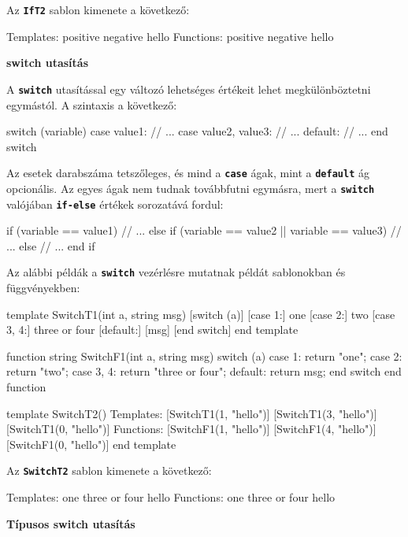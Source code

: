 \documentclass[12pt, a4paper]{report}
\newcommand{\ff}[1]{\textbf{\texttt{#1}}}
\newcommand{\bb}[1]{\textbf{#1}}
\begin{document}
Az \ff{IfT2} sablon kimenete a következő:

\begin{textcode}
Templates:
  positive
  negative
  hello
Functions:
  positive
  negative
  hello
\end{textcode}

\bb{switch utasítás}

A \ff{switch} utasítással egy változó lehetséges értékeit lehet megkülönböztetni egymástól. A szintaxis a következő:

\begin{mgencode}
switch (variable)
case value1:
// ...
case value2, value3:
// ...
default:
// ...
end switch
\end{mgencode}

Az esetek darabszáma tetszőleges, és mind a \ff{case} ágak, mint a \ff{default} ág opcionális. Az egyes ágak nem tudnak továbbfutni egymásra, mert a \ff{switch} valójában \ff{if-else} értékek sorozatává fordul:

\begin{mgencode}
if (variable == value1)
// ...
else if (variable == value2 || variable == value3)
// ...
else
// ...
end if
\end{mgencode}

Az alábbi példák a \ff{switch} vezérlésre mutatnak példát sablonokban és függvényekben:

\begin{mgencode}
template SwitchT1(int a, string msg)
  [switch (a)]
  [case 1:]
one
  [case 2:]
two
  [case 3, 4:]
three or four
  [default:]
[msg]
  [end switch]
end template

function string SwitchF1(int a, string msg)
  switch (a)
  case 1: return "one";
  case 2: return "two";
  case 3, 4: return "three or four";
  default: return msg;
  end switch
end function

template SwitchT2()
Templates:
  [SwitchT1(1, "hello")]
  [SwitchT1(3, "hello")]
  [SwitchT1(0, "hello")]
Functions:
  [SwitchF1(1, "hello")]
  [SwitchF1(4, "hello")]
  [SwitchF1(0, "hello")]
end template
\end{mgencode}

Az \ff{SwitchT2} sablon kimenete a következő:

\begin{textcode}
Templates:
  one
  three or four
  hello
Functions:
  one
  three or four
  hello
\end{textcode}

\bb{Típusos switch utasítás}
\end{document}
